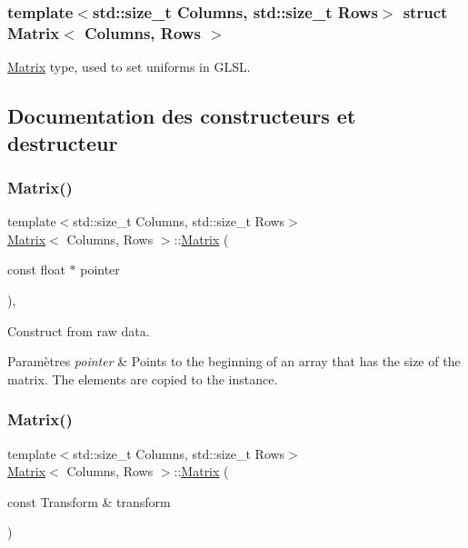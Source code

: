 \subsubsection*{template$<$std\+::size\+\_\+t Columns, std\+::size\+\_\+t Rows$>$\newline
struct Matrix$<$ Columns, Rows $>$}

\hyperlink{structMatrix}{Matrix} type, used to set uniforms in G\+L\+SL. 

\subsection{Documentation des constructeurs et destructeur}
\mbox{\label{structMatrix_ad40da72f526bcd6854d83496d2f62e01}} 
\subsubsection{\texorpdfstring{Matrix()}{Matrix()}\hspace{0.1cm}{\footnotesize\ttfamily [1/2]}}
{\footnotesize\ttfamily template$<$std\+::size\+\_\+t Columns, std\+::size\+\_\+t Rows$>$ \\
\hyperlink{structMatrix}{Matrix}$<$ Columns, Rows $>$\+::\hyperlink{structMatrix}{Matrix} (\begin{DoxyParamCaption}\item[{const float $\ast$}]{pointer }\end{DoxyParamCaption})\hspace{0.3cm}{\ttfamily [inline]}, {\ttfamily [explicit]}}



Construct from raw data. 


\begin{DoxyParams}{Paramètres}
{\em pointer} & Points to the beginning of an array that has the size of the matrix. The elements are copied to the instance. \\
\hline
\end{DoxyParams}
\mbox{\label{structMatrix_acc8ec3ddfe33a01f9ae7970d8fed9855}} 
\subsubsection{\texorpdfstring{Matrix()}{Matrix()}\hspace{0.1cm}{\footnotesize\ttfamily [2/2]}}
{\footnotesize\ttfamily template$<$std\+::size\+\_\+t Columns, std\+::size\+\_\+t Rows$>$ \\
\hyperlink{structMatrix}{Matrix}$<$ Columns, Rows $>$\+::\hyperlink{structMatrix}{Matrix} (\begin{DoxyParamCaption}\item[{const Transform \&}]{transform }\end{DoxyParamCaption})\hspace{0.3cm}{\ttfamily [inline]}}



